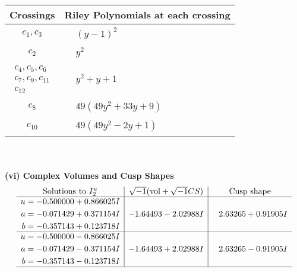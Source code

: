 \documentclass[1p]{elsarticle_modified}
\theoremstyle{definition}
\newcommand{\I}{\sqrt{-1}}
\begin{document}
\begin{tabular}{m{50pt}|m{274pt}}
Crossings & \hspace{64pt}Riley Polynomials at each crossing \\
\hline $$\begin{aligned}c_{1},c_{3}\end{aligned}$$&$\begin{aligned}
&(y-1)^2
\end{aligned}$\\
\hline $$\begin{aligned}c_{2}\end{aligned}$$&$\begin{aligned}
&y^2
\end{aligned}$\\
\hline $$\begin{aligned}c_{4},c_{5},c_{6}\\c_{7},c_{9},c_{11}\\c_{12}\end{aligned}$$&$\begin{aligned}
&y^2+y+1
\end{aligned}$\\
\hline $$\begin{aligned}c_{8}\end{aligned}$$&$\begin{aligned}
&49(49 y^2+33 y+9)
\end{aligned}$\\
\hline $$\begin{aligned}c_{10}\end{aligned}$$&$\begin{aligned}
&49(49 y^2-2 y+1)
\end{aligned}$\\
\hline
\end{tabular}\\~\\
\newpage\flushleft \textbf{(vi) Complex Volumes and Cusp Shapes}
$$\begin{array}{c|c|c}  
\text{Solutions to }I^u_{2}& \I (\text{vol} + \sqrt{-1}CS) & \text{Cusp shape}\\
 \hline 
\begin{aligned}
u &= -0.500000 + 0.866025 I \\
a &= -0.071429 + 0.371154 I \\
b &= -0.357143 + 0.123718 I\end{aligned}
 & -1.64493 - 2.02988 I & \phantom{-}2.63265 + 0.91905 I \\ \hline\begin{aligned}
u &= -0.500000 - 0.866025 I \\
a &= -0.071429 - 0.371154 I \\
b &= -0.357143 - 0.123718 I\end{aligned}
 & -1.64493 + 2.02988 I & \phantom{-}2.63265 - 0.91905 I\\
 \hline 
 \end{array}$$\newpage
\end{document}
